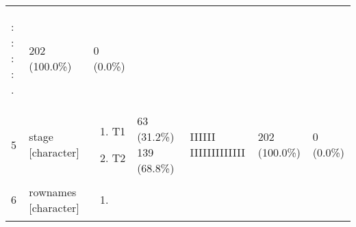 \documentclass[
]{article}
\providecommand{\tightlist}{%
  \setlength{\itemsep}{0pt}\setlength{\parskip}{0pt}}
\begin{document}
\begin{longtable}[]{@{}lllllll@{}}
\begin{minipage}[t]{0.14\columnwidth}
\begin{description}
\tightlist
\item[: : . : :]
: : : : .
\end{description}\strut
\end{minipage} & \begin{minipage}[t]{0.07\columnwidth}\raggedright
202
(100.0\%)\strut
\end{minipage} & \begin{minipage}[t]{0.07\columnwidth}\raggedright
0
(0.0\%)\strut
\end{minipage}\tabularnewline
\begin{minipage}[t]{0.03\columnwidth}\raggedright
5\strut
\end{minipage} & \begin{minipage}[t]{0.16\columnwidth}\raggedright
stage
{[}character{]}\strut
\end{minipage} & \begin{minipage}[t]{0.20\columnwidth}\raggedright
\begin{enumerate}
\def\labelenumi{\arabic{enumi}.}
\tightlist
\item
  T1
\item
  T2
\end{enumerate}\strut
\end{minipage} & \begin{minipage}[t]{0.14\columnwidth}\raggedright
63 (31.2\%)
139 (68.8\%)\strut
\end{minipage} & \begin{minipage}[t]{0.14\columnwidth}\raggedright
IIIIII
IIIIIIIIIIIII\strut
\end{minipage} & \begin{minipage}[t]{0.07\columnwidth}\raggedright
202
(100.0\%)\strut
\end{minipage} & \begin{minipage}[t]{0.07\columnwidth}\raggedright
0
(0.0\%)\strut
\end{minipage}\tabularnewline
\begin{minipage}[t]{0.03\columnwidth}\raggedright
6\strut
\end{minipage} & \begin{minipage}[t]{0.16\columnwidth}\raggedright
rownames
{[}character{]}\strut
\end{minipage} & \begin{minipage}[t]{0.20\columnwidth}\raggedright
\begin{enumerate}
\def\labelenumi{\arabic{enumi}.}
\tightlist
\item

\end{enumerate}
\end{minipage}
\end{longtable}
\end{document}
